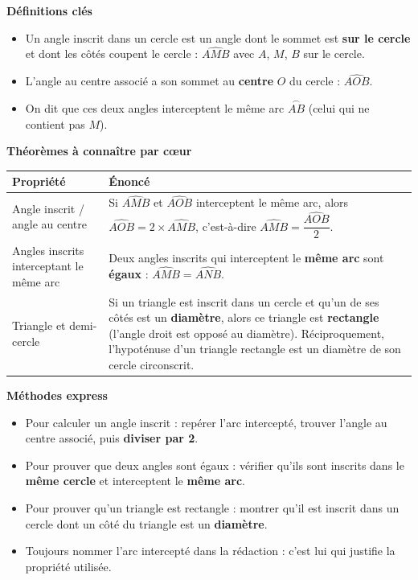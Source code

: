 \documentclass[11pt]{article}
\newcommand{\cle}[1]{{\popxbold\color{popdark}#1}}
\begin{document}
\begin{bilan}
\textbf{Définitions clés}
\begin{itemize}
  \item Un \cle{angle inscrit} dans un cercle est un angle dont le sommet est \textbf{sur le cercle} et dont les côtés coupent le cercle : $\widehat{AMB}$ avec $A$, $M$, $B$ sur le cercle.
  \item L'\cle{angle au centre} associé a son sommet au \textbf{centre} $O$ du cercle : $\widehat{AOB}$.
  \item On dit que ces deux angles \cle{interceptent le même arc} $\overset{\frown}{AB}$ (celui qui ne contient pas $M$).
\end{itemize}

\textbf{Théorèmes à connaître par c\oe ur}
\begin{center}
\begin{tabularx}{\linewidth}{|l|X|}
\hline
\rowcolor{popblueL} \textbf{Propriété} & \textbf{Énoncé} \\
\hline
Angle inscrit / angle au centre & Si $\widehat{AMB}$ et $\widehat{AOB}$ interceptent le même arc, alors $\widehat{AOB}=2\times\widehat{AMB}$, c'est-à-dire $\widehat{AMB}=\dfrac{\widehat{AOB}}{2}$. \\
\hline
Angles inscrits interceptant le même arc & Deux angles inscrits qui interceptent le \textbf{même arc} sont \textbf{égaux} : $\widehat{AMB}=\widehat{ANB}$. \\
\hline
Triangle et demi-cercle & Si un triangle est inscrit dans un cercle et qu'un de ses côtés est un \textbf{diamètre}, alors ce triangle est \textbf{rectangle} (l'angle droit est opposé au diamètre). Réciproquement, l'hypoténuse d'un triangle rectangle est un diamètre de son cercle circonscrit. \\
\hline
\end{tabularx}
\end{center}

\textbf{Méthodes express}
\begin{itemize}
  \item Pour calculer un angle inscrit : repérer l'arc intercepté, trouver l'angle au centre associé, puis \textbf{diviser par 2}.
  \item Pour prouver que deux angles sont égaux : vérifier qu'ils sont inscrits dans le \textbf{même cercle} et interceptent le \textbf{même arc}.
  \item Pour prouver qu'un triangle est rectangle : montrer qu'il est inscrit dans un cercle dont un côté du triangle est un \textbf{diamètre}.
  \item Toujours nommer l'arc intercepté dans la rédaction : c'est lui qui justifie la propriété utilisée.
\end{itemize}
\end{bilan}
\end{document}
